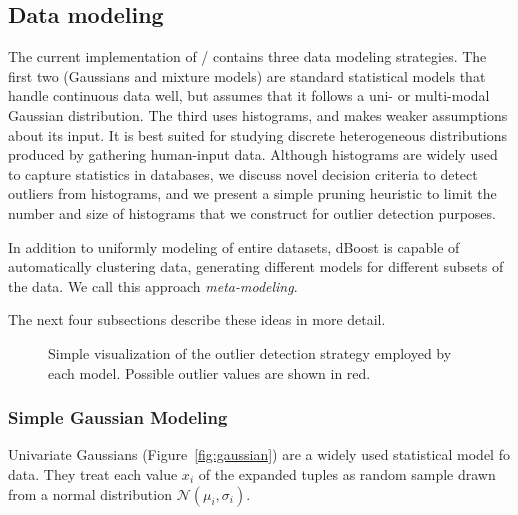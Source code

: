 \subsection{Data modeling}
\label{sec:model-creation}

The current implementation of \dBoost/ contains three data modeling strategies. The first two (Gaussians and mixture models) are standard statistical models that handle continuous data well, but assumes that it follows a uni- or multi-modal Gaussian distribution.
The third uses histograms, and makes weaker assumptions about its input. It is best suited for studying discrete heterogeneous distributions produced by gathering human-input data. Although histograms are widely used to capture statistics in databases, we discuss novel decision criteria to detect outliers from histograms, and we present a simple pruning heuristic to limit the number and size of histograms that we construct for outlier detection purposes.

In addition to uniformly modeling of entire datasets, dBoost is capable of automatically clustering data, generating different models for different subsets of the data. We call this approach \emph{meta-modeling}.

The next four subsections describe these ideas in more detail.

\begin{figure}
  \centering
  \newcommand{\cramped}[3]{\subfloat[#2]{\texttt{[image: \#1]}\label{fig:#3}}}
  \cramped{../../graphics/gaussians-preview.pdf}{Gaussian}{gaussian}\hspace*{.01\linewidth}
  \cramped{../../graphics/mixtures-preview.png}{Mixture}{mixture}\hspace*{.01\linewidth}
  \cramped{../../graphics/histograms-preview.pdf}{Histogram}{histogram}
  \caption{Simple visualization of the outlier detection strategy employed by each model. Possible outlier values are shown in red.}
  \label{fig:models}
\end{figure}

\subsubsection{Simple Gaussian Modeling}
\label{sec:gaus_model}
Univariate Gaussians (Figure~\ref{fig:gaussian}) are a widely used statistical model fo data.  They treat each value $x_i$ of the expanded tuples as random sample drawn from a normal distribution $\mathcal N(\mu_i, \sigma_i)$.

